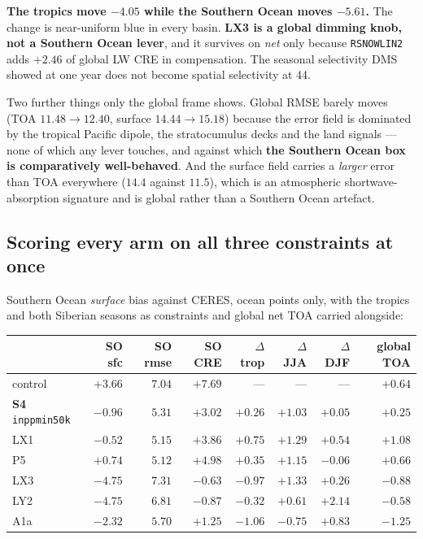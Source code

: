 \documentclass[10pt]{article}
\begin{document}
\noindent \textbf{The tropics move $-4.05$ while the Southern Ocean moves $-5.61$.} The
change is near-uniform blue in every basin. \textbf{LX3 is a global dimming knob, not a
Southern Ocean lever}, and it survives on \emph{net} only because \texttt{RSNOWLIN2} adds
$+2.46$ of global LW CRE in compensation. The seasonal selectivity DMS showed at one year
does not become spatial selectivity at 44.

Two further things only the global frame shows. Global RMSE barely moves (TOA
$11.48\to12.40$, surface $14.44\to15.18$) because the error field is dominated by the
tropical Pacific dipole, the stratocumulus decks and the land signals --- none of which any
lever touches, and against which \textbf{the Southern Ocean box is comparatively
well-behaved}. And the surface field carries a \emph{larger} error than TOA everywhere
($14.4$ against $11.5$), which is an atmospheric shortwave-absorption signature and is
global rather than a Southern Ocean artefact.

\subsection{Scoring every arm on all three constraints at once}\label{sub:r28decision}
Southern Ocean \emph{surface} bias against CERES, ocean points only, with the tropics and
both Siberian seasons as constraints and global net TOA carried alongside:

\begin{center}\footnotesize
\begin{tabular}{l r r r r r r r}
\toprule
& SO sfc & SO rmse & SO CRE & $\Delta$trop & $\Delta$JJA & $\Delta$DJF & global TOA \\
\midrule
control & $+3.66$ & $7.04$ & $+7.69$ & --- & --- & --- & $+0.64$ \\
\textbf{S4} \texttt{inppmin50k} & $\mathbf{-0.96}$ & $5.31$ & $+3.02$ & $+0.26$ & $+1.03$ & $+0.05$ & $\mathbf{+0.25}$ \\
LX1 & $-0.52$ & $5.15$ & $+3.86$ & $+0.75$ & $+1.29$ & $+0.54$ & $+1.08$ \\
P5 & $+0.74$ & $5.12$ & $+4.98$ & $+0.35$ & $+1.15$ & $-0.06$ & $+0.66$ \\
LX3 & $-4.75$ & $7.31$ & $-0.63$ & $-0.97$ & $+1.33$ & $+0.26$ & $-0.88$ \\
LY2 & $-4.75$ & $6.81$ & $-0.87$ & $-0.32$ & $+0.61$ & $+2.14$ & $-0.58$ \\
A1a & $-2.32$ & $5.70$ & $+1.25$ & $-1.06$ & $-0.75$ & $+0.83$ & $-1.25$ \\
\bottomrule
\end{tabular}
\end{center}
\end{document}
